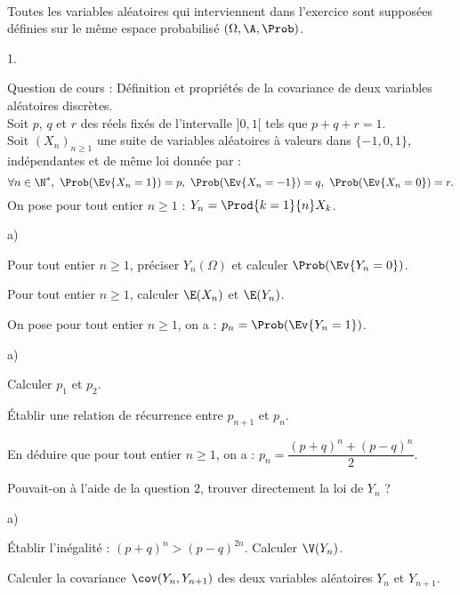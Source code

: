 \documentclass[11pt]{article}
\begin{document}
\begin{exerciceAP}~\\
Toutes les variables aléatoires qui interviennent dans l'exercice sont 
supposées définies sur le même espace probabilisé 
$(\Omega,\A,\Prob)$.
\begin{noliste}{1.}
    \setlength{\itemsep}{2mm}
  \item Question de cours : Définition et propriétés de la covariance 
  de deux variables aléatoires discrètes.\\
  Soit $p$, $q$ et $r$ des réels fixés de l'intervalle $]0,1[$ tels que 
  $p+q+r=1$. \\
  Soit $(X_n)_{n\geq 1}$ une suite de variables aléatoires à 
  valeurs dans $\{-1,0,1\}$, indépendantes et de même loi donnée par :
  \[
    \forall n \in\N^*, \ \Prob(\Ev{X_n=1})=p, \ \Prob(\Ev{X_n=-1})=q, \ 
    \Prob(\Ev{X_n=0})=r.
  \]
  On pose pour tout entier $n\geq 1$ : $Y_n=\Prod{k=1}{n} X_k$.
  
  \item 
  \begin{noliste}{a)}
    \setlength{\itemsep}{2mm}
    \item Pour tout entier $n\geq 1$, préciser $Y_n(\Omega)$ et 
    calculer $\Prob(\Ev{Y_n=0})$.
    
    \item Pour tout entier $n\geq 1$, calculer $\E(X_n)$ et $\E(Y_n)$.
  \end{noliste}
  
  \item On pose pour tout entier $n\geq 1$, on a : 
  $p_n=\Prob(\Ev{Y_n=1})$.
  \begin{noliste}{a)}
    \setlength{\itemsep}{2mm}
    \item Calculer $p_1$ et $p_2$.
    
    \item Établir une relation de récurrence entre $p_{n+1}$ et 
    $p_n$.
    
    \item En déduire que pour tout entier $n\geq 1$, on a : 
    $p_n=\dfrac{(p+q)^n +(p-q)^n}{2}$.
    
    \item Pouvait-on à l'aide de la question $2$, trouver 
    directement la loi de $Y_n$ ?
  \end{noliste}
  
  \item 
  \begin{noliste}{a)}
    \setlength{\itemsep}{2mm}
    \item Établir l'inégalité : $(p+q)^n > (p-q)^{2n}$. Calculer 
    $\V(Y_n)$.
    
    \item Calculer la covariance $\cov(Y_n,Y_{n+1})$ des deux 
    variables aléatoires $Y_n$ et $Y_{n+1}$.
  \end{noliste}
\end{noliste}
\end{exerciceAP}
\end{document}
